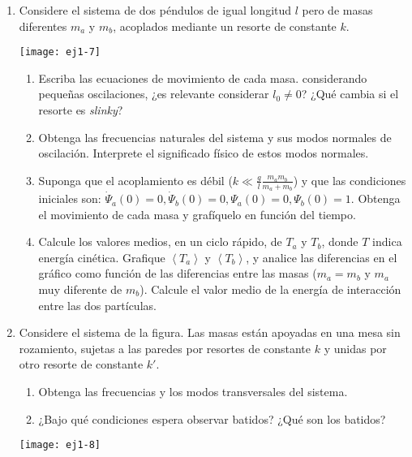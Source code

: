 \documentclass[11pt,spanish,a4paper]{article}
\begin{document}
\begin{enumerate}
\item \label{pendacop}
\begin{minipage}[t][2.2cm]{0.75\textwidth}
Considere el sistema de dos péndulos de igual longitud $l$ pero de masas diferentes $m_{a}$ y $m_{b}$, acoplados mediante un resorte
de constante $k$.
\end{minipage}
\begin{minipage}[c][2cm][t]{0.2\textwidth}
  \texttt{[image: ej1-7]}
\end{minipage}
\begin{enumerate}
	\item Escriba las ecuaciones de movimiento de cada masa. considerando pequeñas oscilaciones, ¿es relevante considerar $l_0\neq0$? ¿Qué cambia si el resorte es \emph{slinky}?   
	\item Obtenga las frecuencias naturales del sistema y sus modos normales de oscilación.
Interprete el significado físico de estos modos normales. 
	\item Suponga que el acoplamiento es débil ($k\ll\frac{g}{l}\frac{m_{a}m_{b}}{m_{a}+m_{b}}$) y que las condiciones iniciales son: $\dot{\Psi}_{a}(0)=0,\dot{\Psi}_{b}(0)=0,\Psi_{a}(0)=0,\Psi_{b}(0)=1$.
Obtenga el movimiento de cada masa y grafíquelo en función del tiempo.
	\item Calcule los valores medios, en un ciclo rápido, de $T_{a}$ y $T_{b}$, donde $T$ indica energía cinética. Grafique $\left\langle T_{a}\right\rangle $ y $\left\langle T_{b}\right\rangle $, y analice las diferencias en el gráfico como función de las diferencias entre las masas ($m_{a}=m_{b}$ y $m_{a}$ muy diferente de $m_{b}$).
Calcule el valor medio de la energía de interacción entre las dos partículas.
\end{enumerate}



\item \label{2masitas}
\begin{minipage}[t][2.8cm]{0.7\textwidth}
Considere el sistema de la figura. Las masas están apoyadas en una mesa sin rozamiento, sujetas a las paredes por resortes de constante
$k$ y unidas por otro resorte de constante $k'$.
\begin{enumerate}
	\item Obtenga las frecuencias y los modos transversales del sistema. 
	\item ¿Bajo qué condiciones espera observar batidos?
	¿Qué son los batidos?
\end{enumerate}
\end{minipage}
\begin{minipage}[c][0cm][t]{0.25\textwidth}
  \texttt{[image: ej1-8]}
\end{minipage}




\end{enumerate}
\end{document}
